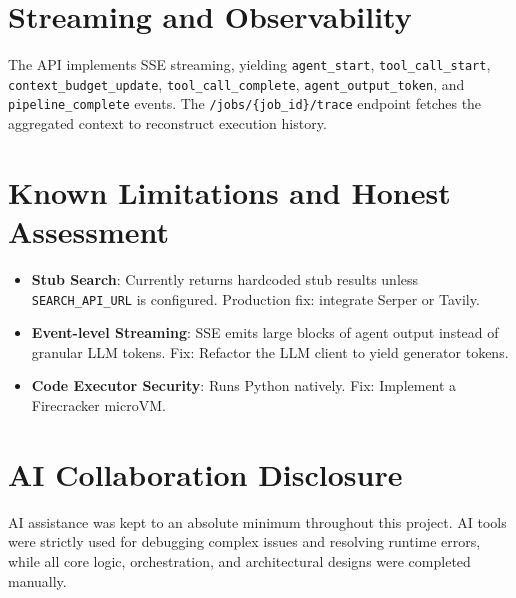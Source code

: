 \documentclass[11pt]{article}
\begin{document}
\section{Streaming and Observability}
The API implements SSE streaming, yielding \texttt{agent\_start}, \texttt{tool\_call\_start}, \texttt{context\_budget\_update}, \texttt{tool\_call\_complete}, \texttt{agent\_output\_token}, and \texttt{pipeline\_complete} events. The \texttt{/jobs/\{job\_id\}/trace} endpoint fetches the aggregated context to reconstruct execution history.

\section{Known Limitations and Honest Assessment}
\begin{itemize}
    \item \textbf{Stub Search}: Currently returns hardcoded stub results unless \texttt{SEARCH\_API\_URL} is configured. Production fix: integrate Serper or Tavily.
    \item \textbf{Event-level Streaming}: SSE emits large blocks of agent output instead of granular LLM tokens. Fix: Refactor the LLM client to yield generator tokens.
    \item \textbf{Code Executor Security}: Runs Python natively. Fix: Implement a Firecracker microVM.
\end{itemize}

\section{AI Collaboration Disclosure}
AI assistance was kept to an absolute minimum throughout this project. AI tools were strictly used for debugging complex issues and resolving runtime errors, while all core logic, orchestration, and architectural designs were completed manually.
\end{document}
